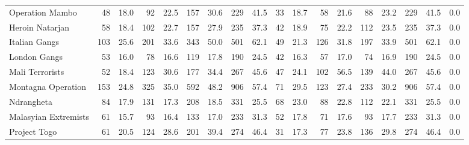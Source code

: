 \begin{tabular}{lrrrrrrrrrrrrrrrrl}
Operation Mambo      &                48 &  18.0 &   92 &  22.5 &  157 &  30.6 &  229 &  41.5 &               33 &   18.7 &   58 &   21.6 &   88 &   23.2 &  229 &  41.5 &        0.0 \\
Heroin Natarjan      &                58 &  18.4 &  102 &  22.7 &  157 &  27.9 &  235 &  37.3 &               42 &   18.9 &   75 &   22.2 &  112 &   23.5 &  235 &  37.3 &        0.0 \\
Italian Gangs        &               103 &  25.6 &  201 &  33.6 &  343 &  50.0 &  501 &  62.1 &               49 &   21.3 &  126 &   31.8 &  197 &   33.9 &  501 &  62.1 &        0.0 \\
London Gangs         &                53 &  16.0 &   78 &  16.6 &  119 &  17.8 &  190 &  24.5 &               42 &   16.3 &   57 &   17.0 &   74 &   16.9 &  190 &  24.5 &        0.0 \\
Mali Terrorists      &                52 &  18.4 &  123 &  30.6 &  177 &  34.4 &  267 &  45.6 &               47 &   24.1 &  102 &   56.5 &  139 &   44.0 &  267 &  45.6 &        0.0 \\
Montagna Operation   &               153 &  24.8 &  325 &  35.0 &  592 &  48.2 &  906 &  57.4 &               71 &   29.5 &  123 &   27.4 &  233 &   30.2 &  906 &  57.4 &        0.0 \\
Ndrangheta           &                84 &  17.9 &  131 &  17.3 &  208 &  18.5 &  331 &  25.5 &               68 &   23.0 &   88 &   22.8 &  112 &   22.1 &  331 &  25.5 &        0.0 \\
Malasyian Extremists &                61 &  15.7 &   93 &  16.4 &  133 &  17.0 &  233 &  31.3 &               52 &   17.8 &   71 &   17.6 &   93 &   17.7 &  233 &  31.3 &        0.0 \\
Project Togo         &                61 &  20.5 &  124 &  28.6 &  201 &  39.4 &  274 &  46.4 &               31 &   17.3 &   77 &   23.8 &  136 &   29.8 &  274 &  46.4 &        0.0 \\
\bottomrule
\end{tabular}
